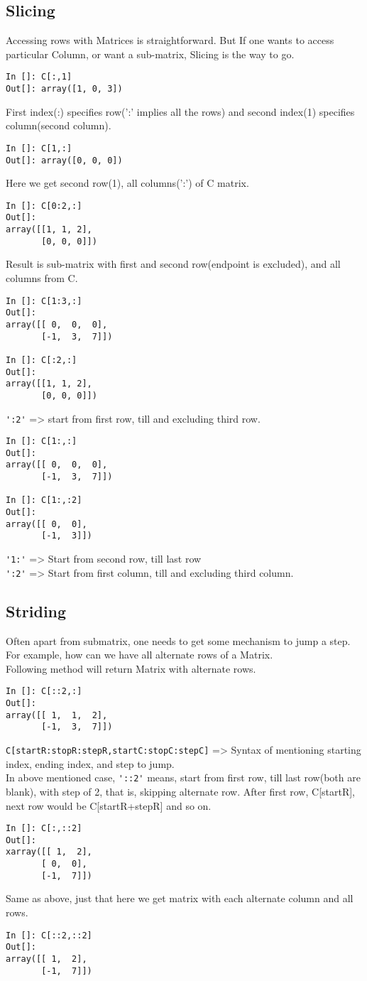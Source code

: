 \documentclass[12pt]{article}
\newcommand{\typ}[1]{\lstinline{#1}}
\begin{document}
\subsection{Slicing}
Accessing rows with Matrices is straightforward. But If one wants to access particular Column, or want a sub-matrix, Slicing is the way to go.
\begin{lstlisting}
In []: C[:,1]
Out[]: array([1, 0, 3])
\end{lstlisting}
First index(:) specifies row(':' implies all the rows) and second index(1) specifies column(second column).
\begin{lstlisting}
In []: C[1,:]
Out[]: array([0, 0, 0])
\end{lstlisting}
Here we get second row(1), all columns(':') of C matrix.
\newpage
\begin{lstlisting}
In []: C[0:2,:]
Out[]: 
array([[1, 1, 2],
       [0, 0, 0]])
\end{lstlisting}
Result is sub-matrix with first and second row(endpoint is excluded), and all columns from C.
\begin{lstlisting}
In []: C[1:3,:]
Out[]: 
array([[ 0,  0,  0],
       [-1,  3,  7]])

In []: C[:2,:]
Out[]: 
array([[1, 1, 2],
       [0, 0, 0]])
\end{lstlisting}
\typ{':2'} => start from first row, till and excluding third row.
\begin{lstlisting}
In []: C[1:,:]
Out[]: 
array([[ 0,  0,  0],
       [-1,  3,  7]])

In []: C[1:,:2]
Out[]: 
array([[ 0,  0],
       [-1,  3]])
\end{lstlisting}
\typ{'1:'} => Start from second row, till last row\\
\typ{':2'} => Start from first column, till and excluding third column.
\newpage
\subsection{Striding}
Often apart from submatrix, one needs to get some mechanism to jump a step. For example, how can we have all alternate rows of a Matrix. \\
Following method will return Matrix with alternate rows.
\begin{lstlisting}
In []: C[::2,:]
Out[]: 
array([[ 1,  1,  2],
       [-1,  3,  7]])
\end{lstlisting}
\typ{C[startR:stopR:stepR,startC:stopC:stepC]} => Syntax of mentioning starting index, ending index, and step to jump.\\
In above mentioned case, \typ{'::2'} means, start from first row, till last row(both are blank), with step of 2, that is, skipping alternate row. After first row, C[startR], next row would be C[startR+stepR] and so on.
\begin{lstlisting}
In []: C[:,::2]
Out[]: 
xarray([[ 1,  2],
       [ 0,  0],
       [-1,  7]])
\end{lstlisting}
Same as above, just that here we get matrix with each alternate column and all rows.
\begin{lstlisting}
In []: C[::2,::2]
Out[]: 
array([[ 1,  2],
       [-1,  7]])
\end{lstlisting}
\end{document}
